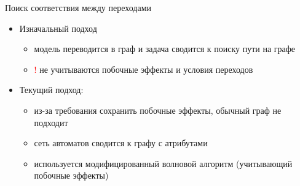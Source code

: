 \documentclass[12pt]{beamer}
\begin{document}
{
\begin{frame}{Поиск соответствия между переходами}
  \begin{mybox}[]
  \begin{itemize}
   	\item Изначальный подход 
   	\begin{itemize}
   	\item модель переводится в граф и задача сводится к поиску пути на графе
   	\item \textcolor{red}{!} не учитываются побочные эффекты и условия переходов
   	\end{itemize}
   	
    \item Текущий подход: 
    \begin{itemize}
    \item из-за требования сохранить побочные эффекты, обычный граф не подходит
    \item сеть автоматов сводится к графу с атрибутами 
    \item используется модифицированный волновой алгоритм (учитывающий побочные эффекты)
    \end{itemize}
  \end{itemize}
  \end{mybox}
\end{frame}
}

\end{document}
